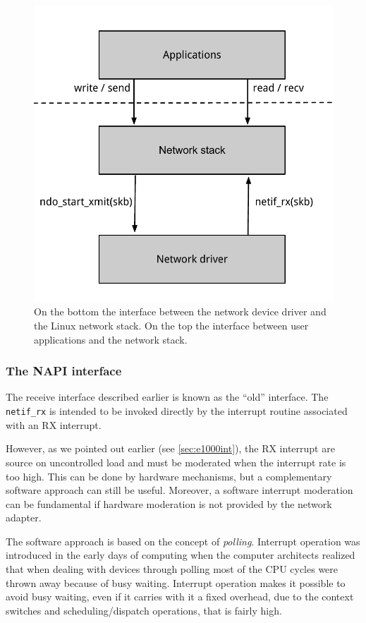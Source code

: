 \begin{figure}[bt]
\centering
\includegraphics[scale = 0.65]{linux-interface.pdf}
\caption{On the bottom the interface between the network device driver and the Linux network stack. On the top the interface between
user applications and the network stack.}
\label{fig:linux-interface}
\end{figure}


\subsubsection{The NAPI interface}
\label{sec:napi}
The receive interface described earlier is known as the ``old'' interface. The \texttt{netif\_rx} is intended to be invoked
directly by the interrupt routine associated with an RX interrupt.

However, as we pointed out earlier (see \ref{sec:e1000int}), the RX interrupt are source on uncontrolled load and must be moderated when
the interrupt rate is too high. This can be done by hardware mechanisms, but a complementary software approach can still be useful.
Moreover, a software interrupt moderation can be fundamental if hardware moderation is not provided by the network adapter.

\vspace{0.5cm}

The software approach is based on the concept of \emph{polling}. Interrupt operation was introduced in the early days of computing when
the computer architects realized that when dealing with devices through polling most of the CPU cycles were thrown away because of
busy waiting. Interrupt operation makes it possible to avoid busy waiting, even if it carries with it a fixed overhead, due to the
context switches and scheduling/dispatch operations, that is fairly high.

